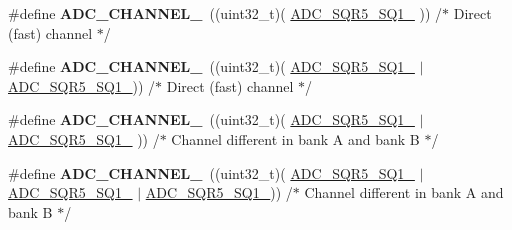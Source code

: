 \begin{DoxyCompactItemize}
\item 
\hypertarget{group___a_d_c__channels_ga66f19737ad81a0a62eb97854d0e41a54}{\#define {\bfseries A\-D\-C\-\_\-\-C\-H\-A\-N\-N\-E\-L\-\_}~((uint32\-\_\-t)(                                  \hyperlink{group___peripheral___registers___bits___definition_ga4e21c2a89e71e60406cacb23de6f6597}{A\-D\-C\-\_\-\-S\-Q\-R5\-\_\-\-S\-Q1\-\_}                                  ))  /$\ast$ Direct (fast) channel $\ast$/}\label{group___a_d_c__channels_ga66f19737ad81a0a62eb97854d0e41a54}

\item 
\hypertarget{group___a_d_c__channels_ga716f2836f655c753c629de439ce50ecf}{\#define {\bfseries A\-D\-C\-\_\-\-C\-H\-A\-N\-N\-E\-L\-\_}~((uint32\-\_\-t)(                                  \hyperlink{group___peripheral___registers___bits___definition_ga4e21c2a89e71e60406cacb23de6f6597}{A\-D\-C\-\_\-\-S\-Q\-R5\-\_\-\-S\-Q1\-\_}                  $\vert$ \hyperlink{group___peripheral___registers___bits___definition_ga6d7b92bf8ba789b76256e205988cc8de}{A\-D\-C\-\_\-\-S\-Q\-R5\-\_\-\-S\-Q1\-\_}))  /$\ast$ Direct (fast) channel $\ast$/}\label{group___a_d_c__channels_ga716f2836f655c753c629de439ce50ecf}

\item 
\hypertarget{group___a_d_c__channels_ga418f0223ea88773157638097391716a5}{\#define {\bfseries A\-D\-C\-\_\-\-C\-H\-A\-N\-N\-E\-L\-\_}~((uint32\-\_\-t)(                                  \hyperlink{group___peripheral___registers___bits___definition_ga4e21c2a89e71e60406cacb23de6f6597}{A\-D\-C\-\_\-\-S\-Q\-R5\-\_\-\-S\-Q1\-\_} $\vert$ \hyperlink{group___peripheral___registers___bits___definition_ga374490cc8d96ed0a40d3f212bc6fd6d1}{A\-D\-C\-\_\-\-S\-Q\-R5\-\_\-\-S\-Q1\-\_}                 ))  /$\ast$ Channel different in bank A and bank B $\ast$/}\label{group___a_d_c__channels_ga418f0223ea88773157638097391716a5}

\item 
\hypertarget{group___a_d_c__channels_ga03b8138c2d87274f94ba675a7e18e666}{\#define {\bfseries A\-D\-C\-\_\-\-C\-H\-A\-N\-N\-E\-L\-\_}~((uint32\-\_\-t)(                                  \hyperlink{group___peripheral___registers___bits___definition_ga4e21c2a89e71e60406cacb23de6f6597}{A\-D\-C\-\_\-\-S\-Q\-R5\-\_\-\-S\-Q1\-\_} $\vert$ \hyperlink{group___peripheral___registers___bits___definition_ga374490cc8d96ed0a40d3f212bc6fd6d1}{A\-D\-C\-\_\-\-S\-Q\-R5\-\_\-\-S\-Q1\-\_} $\vert$ \hyperlink{group___peripheral___registers___bits___definition_ga6d7b92bf8ba789b76256e205988cc8de}{A\-D\-C\-\_\-\-S\-Q\-R5\-\_\-\-S\-Q1\-\_}))  /$\ast$ Channel different in bank A and bank B $\ast$/}\label{group___a_d_c__channels_ga03b8138c2d87274f94ba675a7e18e666}


\end{DoxyCompactItemize}
